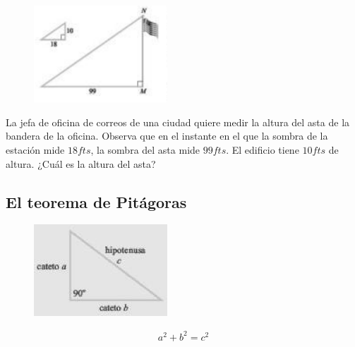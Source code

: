 		\begin{figure}
	\centering
	\includegraphics[width=5cm,keepaspectratio=true]{./trig/trig9448.png}
	\label{fig:9448}
\end{figure}

	\begin{problema}
		\label{exmp:9407}

		La jefa de oficina de correos de una ciudad quiere medir la altura del asta de la bandera de la oficina. Observa que en el instante en el que la sombra de la estación mide $18fts$, la sombra del asta mide $99fts$. El edificio tiene $10fts$ de altura. ¿Cuál es la altura del asta?
	\end{problema}
	

\subsection{El teorema de Pitágoras}
\begin{figure}
	\centering
	\includegraphics[width=5cm,keepaspectratio=true]{./trig/trig94thm.png}
	\label{fig:94thm}
\end{figure}
{}
	\begin{thm}[Pitágoras]
		\begin{align*}
			a^{2}+b^{2}=c^{2}
		\end{align*}
	\end{thm}
	

